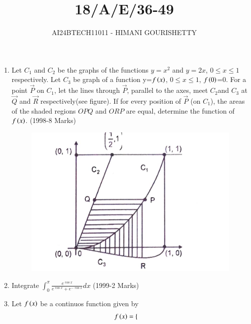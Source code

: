 \documentclass[journal,12pt,twocolumn]{IEEEtran}
\theoremstyle{remark}
\begin{document}

\vspace{3cm}

\title{18/A/E/36-49}
\author{AI24BTECH11011 - HIMANI GOURISHETTY}
\maketitle
\newpage
\bigskip

\renewcommand{\thefigure}{\theenumi}
\renewcommand{\thetable}{\theenumi}

\begin{enumerate}
\item Let $C_1$ and $C_2$ be the graphs of the functions $y=x^2$ and $y=2x$, $0\le x\le1$ respectively. Let $C_3$ be graph of a function  y=$f\left(x\right)$, $0\le x \le 1$, $f\left(0\right)$=0. For a point $\vec{P}$ on $C_1$, let the lines through $\vec{P}$, parallel to the axes, meet $C_2$and $C_3$ at $\vec{Q}$ and $\vec{R}$ respectively(see figure). If for every position of $\vec{P}$ (on $C_1$), the areas of the shaded regions $OPQ$ and $ORP$ are equal, determine the function of $f\left(x\right)$.
\hfill{(1998-8 Marks)}
\begin{figure}[h!]
\centering
\includegraphics[width=1\linewidth]{figs/fig1.png}
\label{fig:11011}
\end{figure}
\item Integrate $\int_{0}^{\pi}\frac{e^{\cos{x}}}{e^{\cos{x}}+e^{-\cos{x}}}dx$
 \hfill{(1999-2 Marks)}\\	      			
\item Let $f\left(x\right)$ be a continuos function given by 
	\begin{align}
	f\left(x\right) &=
	\begin{cases}

\end{cases}
\end{align}
\end{enumerate}
\end{document}
